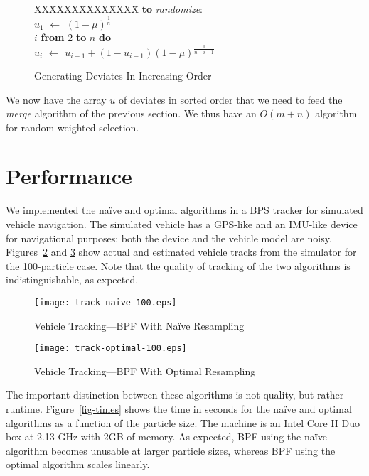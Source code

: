\documentclass[12pt]{article}
\newcommand{\asgn}{\,\,\leftarrow\,\,}
\begin{document}
  \begin{figure}
    \centering
    \begin{minipage}{0.6\textwidth}
      \begin{tabbing}
      XX\=XXXX\=XXXX\=XXXX\=\kill
      {\bf to} {\it randomize}: \\
      \>$u_1 \asgn (1-\mu)^{\frac{1}{n}}$ \\
       $i$ {\bf from} $2$ {\bf to} $n$ {\bf do} \\
      \>\>$u_i \asgn u_{i-1} + (1-u_{i-1})(1-\mu)^{\frac{1}{n-i+1}}$
    \end{tabbing}
    \end{minipage}
    \caption{Generating Deviates In Increasing Order}\label{fig-deviate}
  \end{figure}

  We now have the array $u$ of deviates in sorted order that
  we need to feed the {\em merge} algorithm of the previous
  section.  We thus have an $O(m + n)$ algorithm for random
  weighted selection.

\section{Performance}

  We implemented the na\"ive and optimal algorithms in a BPS
  tracker for simulated vehicle navigation.  The
  simulated vehicle has a GPS-like and an IMU-like device
  for navigational purposes; both the device and the vehicle
  model are noisy.  Figures~\ref{fig-track-naive} and
  \ref{fig-track-optimal} show actual and estimated vehicle
  tracks from the simulator for the 100-particle case.  Note
  that the quality of tracking of the two algorithms is
  indistinguishable, as expected.

  \begin{figure}
    \centering
    \texttt{[image: track-naive-100.eps]}
    \caption{Vehicle Tracking---BPF With Na\"ive Resampling}\label{fig-track-naive}
  \end{figure}

  \begin{figure}
    \centering
    \texttt{[image: track-optimal-100.eps]}
    \caption{Vehicle Tracking---BPF With Optimal Resampling}\label{fig-track-optimal}
  \end{figure}

  The important distinction between these algorithms is not
  quality, but rather runtime.  Figure~\ref{fig-times} shows
  the time in seconds for the na\"ive and optimal algorithms
  as a function of the particle size.  The machine is an
  Intel Core II Duo box at 2.13 GHz with 2GB of memory.  As
  expected, BPF using the na\"ive algorithm becomes unusable
  at larger particle sizes, whereas BPF using the optimal
  algorithm scales linearly.
\end{document}
